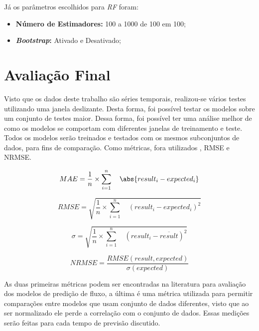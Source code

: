 Já os parâmetros escolhidos para \textit{\acrshort{RF}} foram:

\begin{itemize}
    \item \textbf{Número de Estimadores:} 100 a 1000 de 100 em 100;
    \item \textbf{\textit{Bootstrap}:} Ativado e Desativado;
\end{itemize}

\section{Avaliação Final}




Visto que os dados deste trabalho são séries temporais, realizou-se vários testes utilizando uma janela deslizante. Desta forma, foi possível testar os modelos sobre um conjunto de testes maior. Dessa forma, foi possível ter uma análise melhor de como os modelos se comportam com diferentes janelas de treinamento e teste. Todos os modelos serão treinados e testados com os mesmos subconjuntos de dados, para fins de comparação. Como métricas, fora utilizados , \acrshort{RMSE} e \acrshort{NRMSE}. 

\begin{equation}
MAE = \frac{1}{n} \times \sum_{i=1}^{n} \quad \abs{result_i - expected_i}
\end{equation}

\begin{equation}
RMSE = \sqrt{ \frac{1}{n} \times \sum_{i=1}^{n} \quad (result_i - expected_i) ^ 2}
\end{equation}

\begin{equation}
\sigma = \sqrt{ \frac{1}{n} \times \sum_{i=1}^{n} \quad (result_i - \overline{result}) ^ 2}
\end{equation}

\begin{equation}
NRMSE = \frac{RMSE(result, expected)}{\sigma(expected)}
\end{equation}

As duas primeiras métricas podem ser encontradas na literatura para avaliação dos modelos de predição de fluxo, a última é uma métrica utilizada para permitir comparações entre modelos que usam conjunto de dados diferentes, visto que ao ser normalizado ele perde a correlação com o conjunto de dados. Essas medições serão feitas para cada tempo de previsão discutido.